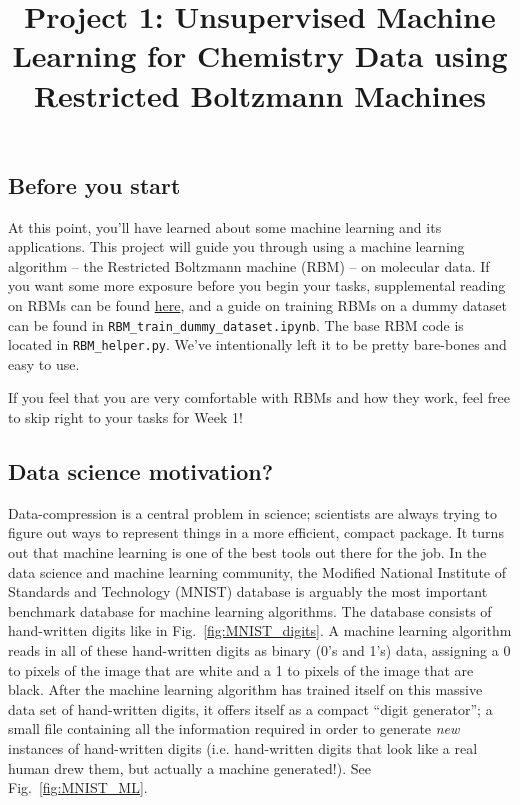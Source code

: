 \documentclass[12pt]{article}
\title{Project 1: Unsupervised Machine Learning for Chemistry Data using Restricted Boltzmann Machines}
\date{}
\begin{document}
\maketitle

\subsection*{Before you start}

At this point, you'll have learned about some machine learning and its applications. This project will guide you through using a machine learning algorithm -- the Restricted Boltzmann machine (RBM) -- on molecular data. If you want some more exposure before you begin your tasks, supplemental reading on RBMs can be found \href{https://qucumber.readthedocs.io/en/stable/_static/RBM_tutorial.pdf}{here}, and a guide on training RBMs on a dummy dataset can be found in \texttt{RBM\_train\_dummy\_dataset.ipynb}. The base RBM code is located in \texttt{RBM\_helper.py}. We've intentionally left it to be pretty bare-bones and easy to use.

If you feel that you are very comfortable with RBMs and how they work, feel free to skip right to your tasks for Week 1!

\subsection*{Data science motivation?}

Data-compression is a central problem in science; scientists are always trying to figure out ways to represent things in a more efficient, compact package. 
It turns out that machine learning is one of the best tools out there for the job.
In the data science and machine learning community, the Modified National Institute of Standards and Technology (MNIST) database is arguably the most important benchmark database for machine learning algorithms. 
The database consists of hand-written digits like in Fig.~\ref{fig:MNIST_digits}. 
A machine learning algorithm reads in all of these hand-written digits as binary (0's and 1's) data, assigning a 0 to pixels of the image that are white and a 1 to pixels of the image that are black. 
After the machine learning algorithm has trained itself on this massive data set of hand-written digits, it offers itself as a compact ``digit generator''; a small file containing all the information required in order to generate \textit{new} instances of hand-written digits (i.e. hand-written digits that look like a real human drew them, but actually a machine generated!). See Fig.~\ref{fig:MNIST_ML}. 
\end{document}

